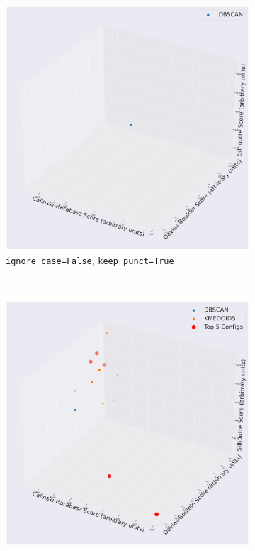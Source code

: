 \documentclass[10pt,oneside]{report}
\begin{document}
\begin{figure}[H]
\begin{subfigure}[b]{0.48\textwidth}
        \includegraphics[width=\textwidth]{./images/mpnet_false-true.png}
        \caption{\texttt{ignore\_case=False}, \texttt{keep\_punct=True}}
        \label{fig:mpnet_ft_f4a_config} %
    \end{subfigure}
    \\
    \vspace{1em}
    \begin{subfigure}[b]{0.48\textwidth}
        \centering
        \includegraphics[width=\textwidth]{./images/mpnet_true-false.png}

\end{subfigure}
\end{figure}
\end{document}
